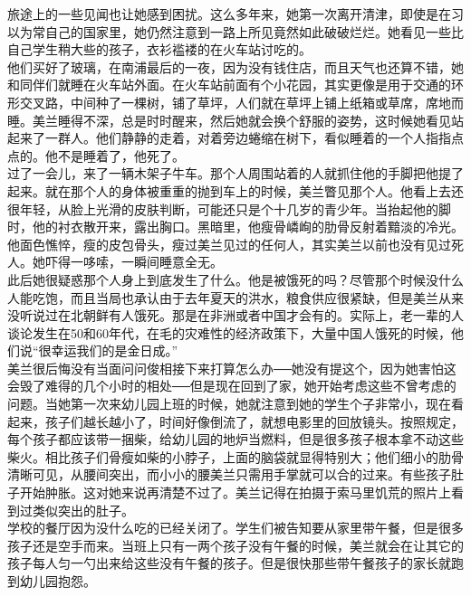 旅途上的一些见闻也让她感到困扰。这么多年来，她第一次离开清津，即使是在习以为常自己的国家里，她仍然注意到一路上所见竟然如此破破烂烂。她看见一些比自己学生稍大些的孩子，衣衫褴褛的在火车站讨吃的。\\

他们买好了玻璃，在南浦最后的一夜，因为没有钱住店，而且天气也还算不错，她和同伴们就睡在火车站外面。在火车站前面有个小花园，其实更像是用于交通的环形交叉路，中间种了一棵树，铺了草坪，人们就在草坪上铺上纸箱或草席，席地而睡。美兰睡得不深，总是时时醒来，然后她就会换个舒服的姿势，这时候她看见站起来了一群人。他们静静的走着，对着旁边蜷缩在树下，看似睡着的一个人指指点点的。他不是睡着了，他死了。\\

过了一会儿，来了一辆木架子牛车。那个人周围站着的人就抓住他的手脚把他提了起来。就在那个人的身体被重重的抛到车上的时候，美兰瞥见那个人。他看上去还很年轻，从脸上光滑的皮肤判断，可能还只是个十几岁的青少年。当抬起他的脚时，他的衬衣散开来，露出胸口。黑暗里，他瘦骨嶙峋的肋骨反射着黯淡的冷光。他面色憔悴，瘦的皮包骨头，瘦过美兰见过的任何人，其实美兰以前也没有见过死人。她吓得一哆嗦，一瞬间睡意全无。\\

此后她很疑惑那个人身上到底发生了什么。他是被饿死的吗？尽管那个时候没什么人能吃饱，而且当局也承认由于去年夏天的洪水，粮食供应很紧缺，但是美兰从来没听说过在北朝鲜有人饿死。那是在非洲或者中国才会有的。实际上，老一辈的人谈论发生在50和60年代，在毛的灾难性的经济政策下，大量中国人饿死的时候，他们说“很幸运我们的是金日成。”\\

美兰很后悔没有当面问问俊相接下来打算怎么办──她没有提这个，因为她害怕这会毁了难得的几个小时的相处──但是现在回到了家，她开始考虑这些不曾考虑的问题。当她第一次来幼儿园上班的时候，她就注意到她的学生个子非常小，现在看起来，孩子们越长越小了，时间好像倒流了，就想电影里的回放镜头。按照规定，每个孩子都应该带一捆柴，给幼儿园的地炉当燃料，但是很多孩子根本拿不动这些柴火。相比孩子们骨瘦如柴的小脖子，上面的脑袋就显得特别大；他们细小的肋骨清晰可见，从腰间突出，而小小的腰美兰只需用手掌就可以合的过来。有些孩子肚子开始肿胀。这对她来说再清楚不过了。美兰记得在拍摄于索马里饥荒的照片上看到过类似突出的肚子。\\

学校的餐厅因为没什么吃的已经关闭了。学生们被告知要从家里带午餐，但是很多孩子还是空手而来。当班上只有一两个孩子没有午餐的时候，美兰就会在让其它的孩子每人匀一勺出来给这些没有午餐的孩子。但是很快那些带午餐孩子的家长就跑到幼儿园抱怨。\\

